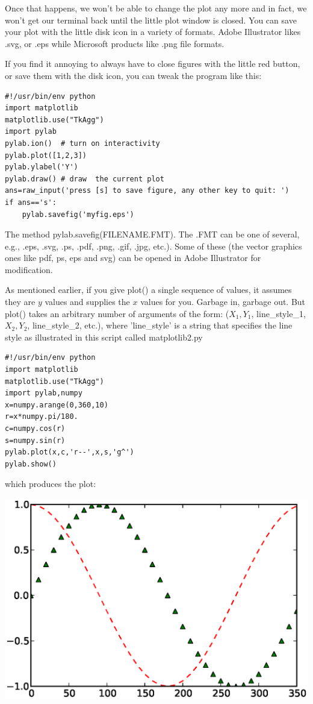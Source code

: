 \documentclass[11pt]{book}
\begin{document}
{{{   \noindent Once that happens, we won't be able to change the plot any more and in fact, we won't get our terminal back until the little plot window is closed.   You can save your plot with the little disk icon in a variety of formats.  Adobe Illustrator likes .svg, or .eps while Microsoft products like .png file formats.  

If you find it annoying to always have to close figures with the little red button, or save them with the disk icon, you can tweak the program like this:

{ \color{blue}\begin{verbatim}
#!/usr/bin/env python
import matplotlib
matplotlib.use("TkAgg") 
import pylab 
pylab.ion()  # turn on interactivity
pylab.plot([1,2,3]) 
pylab.ylabel('Y') 
pylab.draw() # draw  the current plot
ans=raw_input('press [s] to save figure, any other key to quit: ')
if ans=='s':
    pylab.savefig('myfig.eps')
\end{verbatim}}

\noindent The method {\color{blue}pylab.savefig(FILENAME.FMT)}.  The .FMT can be one of several, e.g., .eps, .svg, .ps, .pdf, .png, .gif, .jpg, etc.).   Some of these (the vector graphics ones like pdf,  ps, eps and svg) can be opened in Adobe Illustrator for modification.   


As mentioned earlier, if  you give {\color{blue}plot()} a single sequence of values, it assumes they are $y$ values and supplies the $x$ values for you.  Garbage in, garbage out.  But 
 {\color{blue}plot()} takes an arbitrary number of arguments of the form: ($X_1, Y_1$, line\_style\_1, $X_2, Y_2$, line\_style\_2,  etc.), 
 where 'line\_style' is a string that specifies the line style as illustrated in this script called {\color{blue}matplotlib2.py}


{ \color{blue} \begin{verbatim}
#!/usr/bin/env python
import matplotlib
matplotlib.use("TkAgg")
import pylab,numpy
x=numpy.arange(0,360,10)
r=x*numpy.pi/180.
c=numpy.cos(r)
s=numpy.sin(r)
pylab.plot(x,c,'r--',x,s,'g^')
pylab.show()
\end{verbatim}}

\noindent which produces the plot: 

\includegraphics[width=15cm]{EPSfiles/matplotlib2.eps}

}}}
\end{document}
